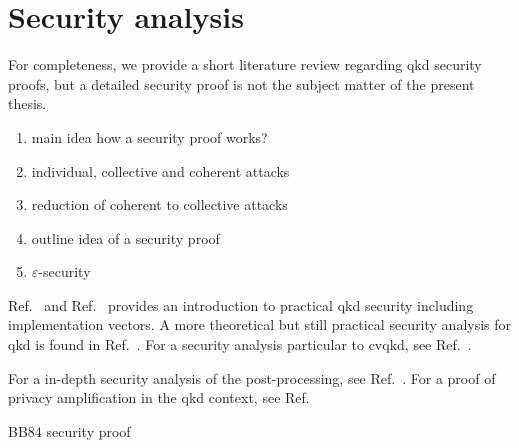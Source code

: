 \section{Security analysis}

For completeness, we provide a short literature review regarding \gls{qkd} security proofs, but a detailed security proof is not the subject matter of the present thesis.

\begin{enumerate}
	\item main idea how a security proof works?
	\item individual, collective and coherent attacks
	\item reduction of coherent to collective attacks~\cite{Renner2009}
	\item outline idea of a security proof
	\item $\varepsilon$-security
\end{enumerate}

Ref.~\cite{Lo2014} and Ref.~\cite{Laudenbach2018} provides an introduction to practical \gls{qkd} security including implementation vectors.
A more theoretical but still practical security analysis for \gls{qkd} is found in Ref.~\cite{Scarani2009}.
For a security analysis particular to \gls{cvqkd}, see Ref.~\cite{Diamanti2015}.

For a in-depth security analysis of the post-processing, see Ref.~\cite{Fung2010}.
For a proof of privacy amplification in the \gls{qkd} context, see Ref.~\cite{Renner2005}

BB84 security proof~\cite{Shor2000}